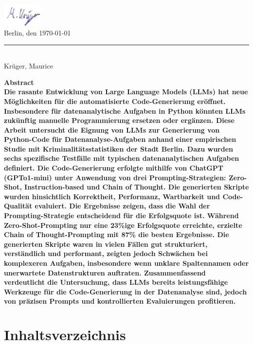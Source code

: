 \documentclass[11pt,a4paper]{article}
\begin{document}
\begin{center}
    \hspace{6cm} \includegraphics[width=2cm]{./bilder/unterschrift.png}\\
    \vspace{-0.9cm}
    Berlin, den \today \hspace{5cm} \rule{5cm}{0.5pt}\\
    \hspace*{7cm} Krüger, Maurice
\end{center}
\newpage

\textbf{
    Abstract\\
    Die rasante Entwicklung von Large Language Models (LLMs) hat neue Möglichkeiten für die automatisierte Code-Generierung eröffnet. Insbesondere für datenanalytische Aufgaben in Python könnten LLMs zukünftig manuelle Programmierung ersetzen oder ergänzen. Diese Arbeit untersucht die Eignung von LLMs zur Generierung von Python-Code für Datenanalyse-Aufgaben anhand einer empirischen Studie mit Kriminalitätsstatistiken der Stadt Berlin.
    Dazu wurden sechs spezifische Testfälle mit typischen datenanalytischen Aufgaben definiert. Die Code-Generierung erfolgte mithilfe von ChatGPT (GPTo1-mini) unter Anwendung von drei Prompting-Strategien: Zero-Shot, Instruction-based und Chain of Thought. Die generierten Skripte wurden hinsichtlich Korrektheit, Performanz, Wartbarkeit und Code-Qualität evaluiert.
    Die Ergebnisse zeigen, dass die Wahl der Prompting-Strategie entscheidend für die Erfolgsquote ist. Während Zero-Shot-Prompting nur eine 23\%ige Erfolgsquote erreichte, erzielte Chain of Thought-Prompting mit 87\% die besten Ergebnisse. Die generierten Skripte waren in vielen Fällen gut strukturiert, verständlich und performant, zeigten jedoch Schwächen bei komplexeren Aufgaben, insbesondere wenn unklare Spaltennamen oder unerwartete Datenstrukturen auftraten.
    Zusammenfassend verdeutlicht die Untersuchung, dass LLMs bereits leistungsfähige Werkzeuge für die Code-Generierung in der Datenanalyse sind, jedoch von präzisen Prompts und kontrollierten Evaluierungen profitieren.
}
\newpage

\section{Inhaltsverzeichnis}
\label{sec:inhaltsverzeichnis}
\tableofcontents
\newpage
\end{document}
